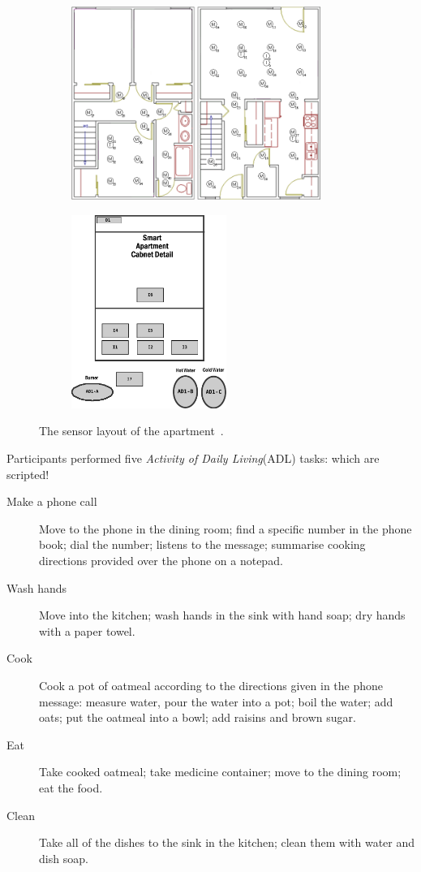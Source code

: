 \documentclass[12pt, a4paper, pdflatex, leqno, twoside, openright]{report}
\begin{document}
\begin{figure}[htb]
  \centering%
  \begin{subfigure}[b]{0.6\textwidth}
    \includegraphics[height=6.3cm]{gfx/Chinook_3_Bedroom_TH}
    \caption{\label{fig:oner:a}}
  \end{subfigure}%
  \begin{subfigure}[b]{0.3\textwidth}
    \includegraphics[height=6.3cm]{gfx/Chinook_Cabinet}
    \caption{\label{fig:oner:b}}
  \end{subfigure}%
  \caption[The sensor layout of the apartment.]{The sensor layout of the apartment~\citep{cook2009assessing}.\label{fig:oner}}
\end{figure}

Participants performed five \emph{Activity of Daily Living}(ADL) tasks:
which are scripted!
\begin{description}
\item[Make a phone call] Move to the phone in the dining room; find a specific number in the phone book; dial the number; listens to the message; summarise cooking directions provided over the phone on a notepad.
\item[Wash hands] Move into the kitchen; wash hands in the sink with hand soap; dry hands with a paper towel.
\item[Cook] Cook a pot of oatmeal according to the directions given in the phone message: measure water, pour the water into a pot; boil the water; add oats; put the oatmeal into a bowl; add raisins and brown sugar.
\item[Eat] Take cooked oatmeal; take medicine container; move to the dining room; eat the food.
\item[Clean] Take all of the dishes to the sink in the kitchen; clean them with water and dish soap.
\end{description}
\end{document}
